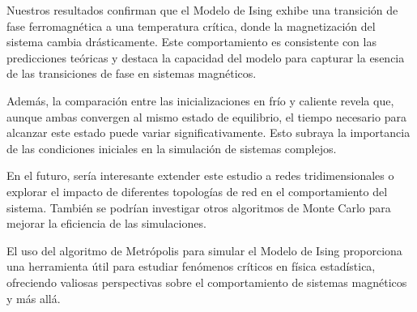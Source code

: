 \documentclass[twocolumn]{article}
\begin{document}
Nuestros resultados confirman que el Modelo de Ising exhibe una transición de fase ferromagnética a una temperatura crítica, donde la magnetización del sistema cambia drásticamente. Este comportamiento es consistente con las predicciones teóricas y destaca la capacidad del modelo para capturar la esencia de las transiciones de fase en sistemas magnéticos.

Además, la comparación entre las inicializaciones en frío y caliente revela que, aunque ambas convergen al mismo estado de equilibrio, el tiempo necesario para alcanzar este estado puede variar significativamente. Esto subraya la importancia de las condiciones iniciales en la simulación de sistemas complejos.

En el futuro, sería interesante extender este estudio a redes tridimensionales o explorar el impacto de diferentes topologías de red en el comportamiento del sistema. También se podrían investigar otros algoritmos de Monte Carlo para mejorar la eficiencia de las simulaciones.

El uso del algoritmo de Metrópolis para simular el Modelo de Ising proporciona una herramienta útil para estudiar fenómenos críticos en física estadística, ofreciendo valiosas perspectivas sobre el comportamiento de sistemas magnéticos y más allá.



\end{document}
